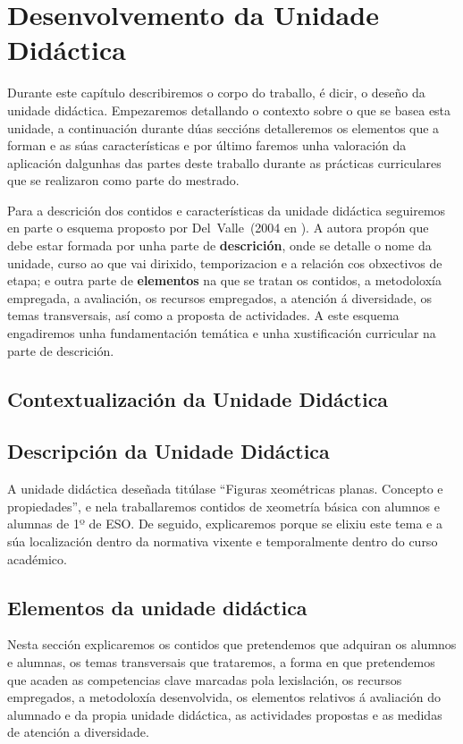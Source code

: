 \chapter{Desenvolvemento da Unidade Didáctica}\label{chap:desenvolvemento}
Durante este capítulo describiremos o corpo do traballo, é dicir, o deseño da unidade didáctica. Empezaremos detallando o contexto sobre o que se basea esta unidade, a continuación durante dúas seccións detalleremos os elementos que a forman e as súas características e por último faremos unha valoración da aplicación dalgunhas das partes deste traballo durante as prácticas curriculares que se realizaron como parte do mestrado.

Para a descrición dos contidos e características da unidade didáctica seguiremos en parte o esquema proposto por Del~Valle~(2004 en ). A autora propón que debe estar formada por unha parte de \textbf{descrición}, onde se detalle o nome da unidade, curso ao que vai dirixido, temporizacion e a relación cos obxectivos de etapa; e outra parte de \textbf{elementos} na que se tratan os contidos, a metodoloxía empregada, a avaliación, os recursos empregados, a atención á diversidade, os temas transversais, así como a proposta de actividades. A este esquema engadiremos unha fundamentación temática e unha xustificación curricular na parte de descrición.

\section{Contextualización da Unidade Didáctica}


\section{Descripción da Unidade Didáctica}
A unidade didáctica deseñada titúlase ``Figuras xeométricas planas. Concepto e propiedades'', e nela traballaremos contidos de xeometría básica con alumnos e alumnas de 1º de ESO. De seguido, explicaremos porque se elixiu este tema e a súa localización dentro da normativa vixente e temporalmente dentro do curso académico.





\section{Elementos da unidade didáctica}
Nesta sección explicaremos os contidos que pretendemos que adquiran os alumnos e alumnas, os temas transversais que trataremos, a forma en que pretendemos que acaden as competencias clave marcadas pola lexislación, os recursos empregados, a metodoloxía desenvolvida, os elementos relativos á avaliación do alumnado e da propia unidade didáctica, as actividades propostas e as medidas de atención a diversidade.

